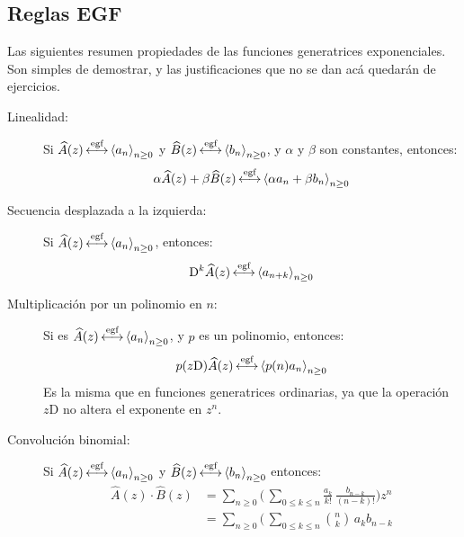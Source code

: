 \subsection{Reglas EGF}
\label{sec:reglas-EGF}

  Las siguientes resumen propiedades
  de las funciones generatrices exponenciales.
  Son simples de demostrar,
  y las justificaciones que no se dan acá quedarán de ejercicios.
  \begin{description}
  \item[Linealidad:]
    Si \(\widehat{A}(z)
	   \operatorname{\stackrel{\text{egf}}{\longleftrightarrow}} \left\langle a_n \right\rangle_{n \ge 0}\)
    y \(\widehat{B}(z)
	  \operatorname{\stackrel{\text{egf}}{\longleftrightarrow}} \left\langle b_n \right\rangle_{n \ge 0}\),
    y \(\alpha\) y \(\beta\) son constantes,
    entonces:
    \begin{equation*}
      \alpha \widehat{A}(z) + \beta \widehat{B}(z)
	\operatorname{\stackrel{\text{egf}}{\longleftrightarrow}} \left\langle
	       \alpha a_n + \beta b_n
	     \right\rangle_{n \ge 0}
    \end{equation*}
  \item[Secuencia desplazada a la izquierda:]
    Si \(\widehat{A}(z)
	   \operatorname{\stackrel{\text{egf}}{\longleftrightarrow}} \left\langle a_n \right\rangle_{n \ge 0}\),
    entonces:
    \begin{equation*}
      \mathrm{D}^k \widehat{A}(z)
	\operatorname{\stackrel{\text{egf}}{\longleftrightarrow}} \left\langle a_{n + k} \right\rangle_{n \ge 0}
    \end{equation*}
  \item[Multiplicación por un polinomio en \(n\):]
    Si es \(\widehat{A}(z)
	      \operatorname{\stackrel{\text{egf}}{\longleftrightarrow}} \left\langle a_n \right\rangle_{n \ge 0}\),
    y \(p\) es un polinomio,
    entonces:
    \begin{equation*}
      p(z \mathrm{D}) \widehat{A}(z)
	\operatorname{\stackrel{\text{egf}}{\longleftrightarrow}} \left\langle p(n) a_n \right\rangle_{n \ge 0}
    \end{equation*}
    Es la misma que en funciones generatrices ordinarias,
    ya que la operación \(z \mathrm{D}\)
    no altera el exponente en \(z^n\).
  \item[Convolución binomial:]
    Si \(\widehat{A}(z)
	   \operatorname{\stackrel{\text{egf}}{\longleftrightarrow}} \left\langle a_n \right\rangle_{n \ge 0}\) y
    \(\widehat{B}(z)
	\operatorname{\stackrel{\text{egf}}{\longleftrightarrow}} \left\langle b_n \right\rangle_{n \ge 0}\)
    entonces:
    \begin{align*}
      \widehat{A}(z) \cdot \widehat{B}(z)
	&= \sum_{n \ge 0}\biggl( \,
			   \sum_{0 \le k \le n}
			   \frac{a_k}{k!} \, \frac{b_{n - k}}
						  {(n - k)!}
			 \biggr) z^n \\
	&= \sum_{n \ge 0} \biggl( \,
			    \sum_{0 \le k \le n}
			       \binom{n}{k} \, a_k b_{n - k}

\end{align*}
\end{description}
